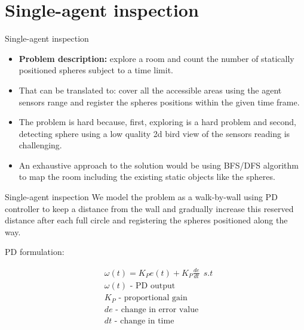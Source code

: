 \documentclass[10pt]{beamer}
\begin{document}
\section{Single-agent inspection}
\begin{frame}{Single-agent inspection}
\begin{itemize}
    \item {\bf Problem description:} explore a room and count the number of statically positioned spheres subject to a time limit. 
    \item That can be translated to: cover all the accessible areas using the agent sensors range and register the spheres positions within the given time frame.
    \item The problem is hard because, first, exploring is a hard problem and second, detecting sphere using a low quality 2d bird view of the sensors reading is challenging.
    \item An exhaustive approach to the solution would be using BFS/DFS algorithm to map the room including the existing static objects like the spheres.
\end{itemize}
\end{frame}

\begin{frame}{Single-agent inspection}
    We model the problem as a walk-by-wall using PD controller to keep a distance from the wall and gradually increase this reserved distance after each full circle and registering the spheres positioned along the way.
    
    PD formulation:

\begin{align*} 
&\omega(t)=K_{P} e(t)+K_{P} \frac{d e}{d t}\ \ s.t\\
&\omega(t)\text{ - PD output }\\
&K_{P}\text{ - proportional gain }\\
&de\text{ - change in error value }\\
&dt\text{ - change in time } 
\end{align*}    

\end{frame}
\end{document}
